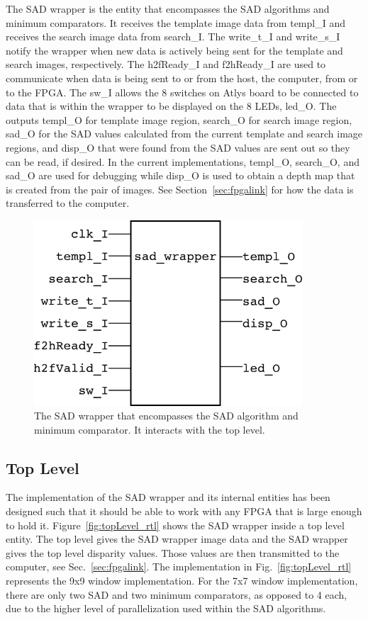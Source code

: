 The SAD wrapper is the entity that encompasses the SAD algorithms and minimum comparators. It receives the template image data from templ\_I and receives the search image data from search\_I. The write\_t\_I and write\_s\_I notify the wrapper when new data is actively being sent for the template and search images, respectively. The h2fReady\_I and f2hReady\_I are used to communicate when data is being sent to or from the host, the computer, from or to the FPGA. The sw\_I allows the 8 switches on Atlys board to be connected to data that is within the wrapper to be displayed on the 8 LEDs, led\_O. The outputs templ\_O for template image region, search\_O for search image region, sad\_O for the SAD values calculated from the current template and search image regions, and disp\_O that were found from the SAD values are sent out so they can be read, if desired. In the current implementations, templ\_O, search\_O, and sad\_O are used for debugging while disp\_O is used to obtain a depth map that is created from the pair of images. See Section~\ref{sec:fpgalink} for how the data is transferred to the computer.

\begin{figure}[h]
	\begin{center}
		\includegraphics[width=100mm]{figures/sad_wrapper_rtl.png}
		\captionfonts
		\caption{The SAD wrapper that encompasses the SAD algorithm and minimum comparator. It interacts with the top level.}
		\label{fig:sadWrapper_rtl}
	\end{center}
\end{figure}


\subsection{Top Level}

The implementation of the SAD wrapper and its internal entities has been designed such that it should be able to work with any FPGA that is large enough to hold it. Figure~\ref{fig:topLevel_rtl} shows the SAD wrapper inside a top level entity. The top level gives the SAD wrapper image data and the SAD wrapper gives the top level disparity values. Those values are then transmitted to the computer, see Sec.~\ref{sec:fpgalink}. The implementation in Fig.~\ref{fig:topLevel_rtl} represents the 9x9 window implementation. For the 7x7 window implementation, there are only two SAD and two minimum comparators, as opposed to 4 each, due to the higher level of parallelization used within the SAD algorithms.

